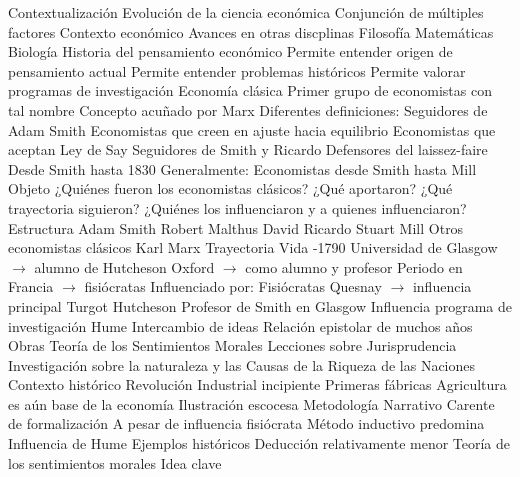 \documentclass{nuevotema}
\begin{document}
\esquemalargo










\begin{esquemal}
	\1[] 
		\2 Contextualización
			\3 Evolución de la ciencia económica
				\4 Conjunción de múltiples factores
				\4 Contexto económico
				\4 Avances en otras discplinas
				\4[] Filosofía
				\4[] Matemáticas
				\4[] Biología
			\3 Historia del pensamiento económico
				\4 Permite entender origen de pensamiento actual
				\4 Permite entender problemas históricos
				\4 Permite valorar programas de investigación
			\3 Economía clásica
				\4 Primer grupo de economistas con tal nombre
				\4 Concepto acuñado por Marx
				\4 Diferentes definiciones:
				\4[] Seguidores de Adam Smith
				\4[] Economistas que creen en ajuste hacia equilibrio
				\4[] Economistas que aceptan Ley de Say
				\4[] Seguidores de Smith y Ricardo
				\4[] Defensores del laissez-faire
				\4[] Desde Smith hasta 1830
				\4 Generalmente:
				\4[] Economistas desde Smith hasta Mill
		\2 Objeto
			\3 ¿Quiénes fueron los economistas clásicos?
			\3 ¿Qué aportaron?
			\3 ¿Qué trayectoria siguieron?
			\3 ¿Quiénes los influenciaron y a quienes influenciaron?
		\2 Estructura
			\3 Adam Smith
			\3 Robert Malthus
			\3 David Ricardo
			\3 Stuart Mill
			\3 Otros economistas clásicos
			\3 Karl Marx
	\1 
		\2 Trayectoria
			\3 Vida
				-1790
				\4 Universidad de Glasgow $\to$ alumno de Hutcheson
				\4 Oxford $\to$ como alumno y profesor
				\4 Periodo en Francia $\to$ fisiócratas
			\3 Influenciado por:
				\4 Fisiócratas
				\4[] Quesnay $\to$ influencia principal
				\4[] Turgot
				\4 Hutcheson
				\4[] Profesor de Smith en Glasgow
				\4[] Influencia programa de investigación
				\4 Hume
				\4[] Intercambio de ideas
				\4[] Relación epistolar de muchos años
			\3 Obras
				\4 Teoría de los Sentimientos Morales
				\4 Lecciones sobre Jurisprudencia
				\4 Investigación sobre la naturaleza y las Causas de la Riqueza de las Naciones
			\3 Contexto histórico
				\4 Revolución Industrial incipiente
				\4 Primeras fábricas
				\4 Agricultura es aún base de la economía
				\4 Ilustración escocesa
		\2 Metodología
			\3 Narrativo
				\4 Carente de formalización
				\4 A pesar de influencia fisiócrata
			\3 Método inductivo predomina
				\4 Influencia de Hume
				\4 Ejemplos históricos
				\4 Deducción relativamente menor
		\2 Teoría de los sentimientos morales
			\3 Idea clave

\end{esquemal}
\end{document}
